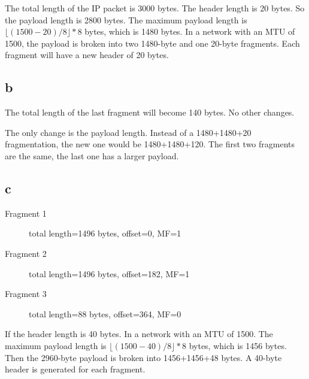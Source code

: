 \documentclass[11pt]{article}
\begin{document}
The total length of the IP packet is 3000 bytes. The header length is 20 bytes. So the payload length is 2800 bytes. The maximum payload length is $\lfloor(1500-20)/8\rfloor*8$ bytes, which is 1480 bytes. In a network with an MTU of 1500, the payload is broken into two 1480-byte and one 20-byte fragments. Each fragment will have a new header of 20 bytes.
\subsection{b}
The total length of the last fragment will become 140 bytes. No other changes.

The only change is the payload length. Instead of a 1480+1480+20 fragmentation, the new one would be 1480+1480+120. The first two fragments are the same, the last one has a larger payload.
\subsection{c}
\begin{description}
\item[Fragment 1] total length=1496 bytes, offset=0, MF=1
\item[Fragment 2] total length=1496 bytes, offset=182, MF=1
\item[Fragment 3] total length=88 bytes, offset=364, MF=0
\end{description}

If the header length is 40 bytes. In a network with an MTU of 1500. The maximum payload length is $\lfloor(1500-40)/8\rfloor*8$ bytes, which is 1456 bytes. Then the 2960-byte payload is broken into 1456+1456+48 bytes. A 40-byte header is generated for each fragment.
\end{document}
